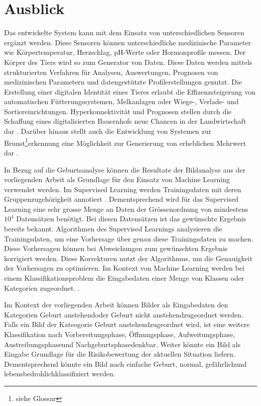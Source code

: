 

\chapter{Ausblick}
Das entwickelte System kann mit dem Einsatz von unterschiedlichen Sensoren ergänzt werden. Diese Sensoren können unterschiedliche medizinische Parameter wie Körpertemperatur, Herzschlag,  pH-Werte oder Hormonprofile messen. Der Körper des Tiers wird so zum Generator von Daten. Diese Daten werden mittels strukturierten Verfahren für Analysen, Auswertungen, Prognosen von medizinischen Parametern und datengestützte Profilerstellungen genutzt. Die Erstellung einer digitalen Identität eines Tieres erlaubt die Effizenzsteigerung von automatischen Fütterungssystemen, Melkanlagen oder Wiege-, Verlade- und Sortiereinrichtungen. Hyperkonnektivität und Prognosen stellen durch die Schaffung eines digitalisierten Bauernhofs neue Chancen in der Landwirtschaft dar \citep[S. 308 ff.]{Kasprowicz2019}. Darüber hinaus stellt auch die Entwicklung von Systemen zur \gls{Brunst}\footnote{\label{glossar-brunst}siehe Glossar}erkennung eine Möglichkeit zur Generierung von erheblichen Mehrwert dar \citep{Hirsbrunner2020}.


In Bezug auf die Geburtsanalyse können die Resultate der Bildanalyse aus der vorliegenden Arbeit als Grundlage für den Einsatz von Machine Learning verwendet werden.
Im Supervised Learning werden Trainingsdaten mit deren Gruppenzugehörigkeit annotiert \citep[S. 253]{Firouzi2020}. 
Dementsprechend wird für das Supervised Learning eine sehr grosse Menge an Daten der Grössenordnung von mindestens ${10^4}$ Datensätzen benötigt. Bei diesen Datensätzen ist das gewünschte Ergebnis bereits bekannt. Algorithmen des Supervised Learnings analysieren die Trainingsdaten, um eine Vorhersage über genau diese Trainingsdaten zu machen. Diese Vorhersagen können bei Abweichungen zum gewünschten Ergebnis korrigiert werden. Diese Korrekturen nutzt der Algorithmus, um die Genauigkeit der Vorhersagen zu optimieren. Im Kontext von Machine Learning werden bei einem Klassifikationsproblem die Eingabedaten einer Menge von Klassen oder Kategorien zugeordnet. \citep[S. 440]{FernandezVillan2019}.

Im Kontext der vorliegenden Arbeit können Bilder als Eingabedaten den Kategorien \flqq Geburt anstehend\frqq oder \flqq Geburt nicht anstehend\frqq zugeordnet werden. Falls ein Bild der Kateogorie \flqq Geburt anstehend\frqq zugeordnet wird, ist eine weitere Klassifikation nach \flqq Vorbereitungsphase\frqq, \flqq Öffnungsphase\frqq, \flqq Aufweitungsphase\frqq, \flqq Austreibungsphase\frqq und \flqq Nachgeburtsphase\frqq denkbar. Weiter könnte ein Bild als Eingabe Grundlage für die Risikobewertung der aktuellen Situation liefern. Dementsprechend könnte ein Bild nach \flqq einfache Geburt\frqq, \flqq normal\frqq, \flqq gefährlich\frqq und \flqq lebensbedrohlich\frqq klassifiziert werden. 

